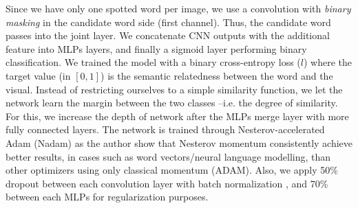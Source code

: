 \documentclass[phd,tocprelim]{cornell}
\begin{document}
Since we have only one spotted word per image, we use a convolution with \textit{binary masking} in the candidate word side (first channel). Thus, the candidate word passes into the joint layer. We concatenate CNN outputs with the additional feature into MLPs layers, and finally a sigmoid layer performing binary classification. We trained the model with a binary cross-entropy loss ($l$) where the target value (in $[0,1]$) is the semantic relatedness between the word and the visual. Instead of restricting ourselves to a simple similarity function, we let the network learn the margin between the two classes --i.e. the degree of similarity. For this, we increase the depth of network after the MLPs merge layer with more fully connected layers. The network is trained through Nesterov-accelerated Adam (Nadam) \cite{dozat2016incorporating} as the author show that Nesterov momentum consistently achieve better results, in cases such as word vectors/neural language modelling, than other optimizers using only classical momentum (ADAM). Also, we apply 50\% dropout between each convolution layer with batch normalization \cite{ioffe2015batch}, and 70\% between each MLPs for regularization purposes.





\end{document}

